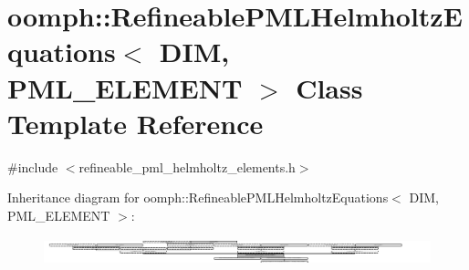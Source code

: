 \hypertarget{classoomph_1_1RefineablePMLHelmholtzEquations}{}\section{oomph\+:\+:Refineable\+P\+M\+L\+Helmholtz\+Equations$<$ D\+IM, P\+M\+L\+\_\+\+E\+L\+E\+M\+E\+NT $>$ Class Template Reference}
\label{classoomph_1_1RefineablePMLHelmholtzEquations}


{\ttfamily \#include $<$refineable\+\_\+pml\+\_\+helmholtz\+\_\+elements.\+h$>$}

Inheritance diagram for oomph\+:\+:Refineable\+P\+M\+L\+Helmholtz\+Equations$<$ D\+IM, P\+M\+L\+\_\+\+E\+L\+E\+M\+E\+NT $>$\+:\begin{figure}[H]
\begin{center}
\leavevmode
\includegraphics[height=0.815308cm]{classoomph_1_1RefineablePMLHelmholtzEquations}
\end{center}
\end{figure}
